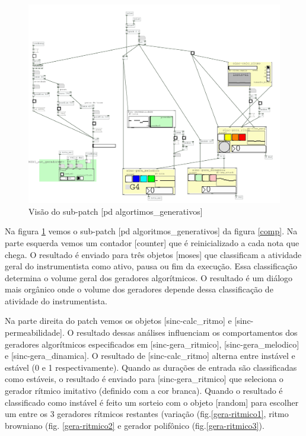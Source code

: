 \documentclass{ppgmus}
\begin{document}


\begin{figure}
\includegraphics[scale=.4]{algoritmo}
\caption{Visão do sub-patch [pd algortimos\_generativos]}
\label{algoritmo}
\end{figure}


Na figura \ref{algoritmo} vemos o sub-patch [pd algoritmos\_generativos] da figura \ref{comp}.
Na parte esquerda vemos um contador [counter] que é reinicializado a cada nota que chega. O resultado
é enviado para três objetos [moses] que classificam a atividade geral do instrumentista como
 ativo, pausa ou fim da execução. Essa classificação determina o volume geral dos geradores algorítmicos.
O resultado é um diálogo mais orgânico onde o volume dos geradores depende dessa classificação de 
atividade do instrumentista. 

Na parte direita do patch vemos os objetos [sinc-calc\_ritmo] e [sinc-permeabilidade].
O resultado dessas análises influenciam os comportamentos dos geradores algorítmicos especificados em
[sinc-gera\_ritmico], [sinc-gera\_melodico] e [sinc-gera\_dinamica]. O resultado de [sinc-calc\_ritmo] 
alterna entre instável e estável (0 e 1 respectivamente). Quando as durações de entrada são classificadas
como estáveis, o resultado é enviado para [sinc-gera\_ritmico] que seleciona o gerador rítmico imitativo 
(definido com a cor branca). Quando o resultado é classificado como instável é feito um sorteio com o
objeto [random] para escolher um entre os 3 geradores rítmicos restantes (variação (fig.\ref{gera-ritmico1}, ritmo
browniano (fig. \ref{gera-ritmico2} e gerador polifônico (fig.\ref{gera-ritmico3}).
\end{document}
